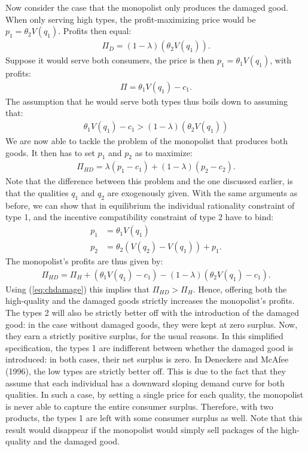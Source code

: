 Now consider the case that the monopolist only produces the damaged good. When only serving high types, the profit-maximizing price would be
$p_1=\theta_2V(q_1)$. Profits then equal:
\begin{align}
	\Pi_D=(1-\lambda)(\theta_2V(q_1)).
\end{align}
Suppose it would serve both consumers, the price is then $p_1=\theta_1V(q_1)$, with profits:
\begin{align}
	\Pi=\theta_1V(q_1)-c_1.
\end{align}
The assumption that he would serve both types thus boils down to assuming that:
\begin{align}
	\theta_1V(q_1)-c_1>(1-\lambda)(\theta_2V(q_1))
	\label{eq:chdamage}
\end{align}
We are now able to tackle the problem of the monopolist that produces both goods.
It then has to set $p_1$ and $p_2$ as to maximize:
\begin{align}
	\Pi_{HD}=\lambda(p_1-c_1)+(1-\lambda)(p_2-c_2).
\end{align}
Note that the difference between this problem and the one
discussed earlier, is that the qualities $q_1$ and $q_2$ are exogenously given.
With the same
arguments as before, we can show that in equilibrium the individual rationality constraint
of type 1, and the incentive compatibility constraint of type 2 have to bind:
\begin{align}
	p_1 & =\theta_1V(q_1)               \\
	p_2 & =\theta_2(V(q_2)-V(q_1))+p_1.
\end{align}
The monopolist's profits are thus given by:
\begin{align}
	\Pi_{HD}=\Pi_H+(\theta_1V(q_1)-c_1)-(1-\lambda)(\theta_2V(q_1)-c_1).
\end{align}
Using (\ref{eq:chdamage}) this implies that $\Pi_{HD}>\Pi_H$.
Hence, offering both the high-quality and the damaged goods strictly increases the monopolist’s profits. The types 2 will also be strictly
better off with the introduction of the
damaged good: in the case without damaged goods, they were kept at zero surplus. Now,
they earn a strictly positive surplus, for the usual reasons. In this simplified specification,
the types 1 are indifferent between whether the damaged good is introduced: in
both cases, their net surplus is zero.
In Deneckere and McAfee (1996), the low types are
strictly better off. This is due to the fact that they assume that each individual has a
downward sloping demand curve for both qualities. In such a case, by setting a single
price for each quality, the monopolist is never able to capture the entire consumer surplus. Therefore, with two products, the types 1 are left with some consumer surplus as
well. Note that this result would disappear if the monopolist would simply sell packages
of the high-quality and the damaged good.

